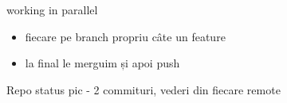 \documentclass{beamer}
\begin{document}
%

\begin{frame}{working in parallel}
  \begin{itemize}
    \item fiecare pe branch propriu câte un feature
    \item la final le merguim și apoi push
  \end{itemize}
\end{frame}

\begin{frame}{Repo status}
pic - 2 commituri, vederi din fiecare remote
\end{frame}
\end{document}
